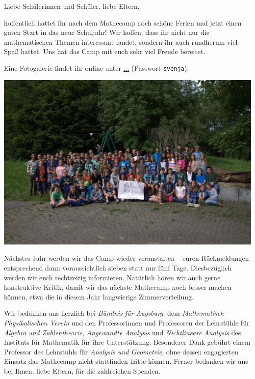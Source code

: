 \documentclass[12pt]{zettel}
\begin{document}
\renewcommand{\betreff}{Mathecamp -- schön war's!}

\makeletterhead{}
\vspace{-2em}

Liebe Schülerinnen und Schüler, liebe Eltern,

hoffentlich hattet ihr nach dem Mathecamp noch schöne Ferien und jetzt einen
guten Start in das neue Schuljahr! Wir hoffen, dass ihr nicht nur die
mathematischen Themen interessant fandet, sondern ihr auch rundherum viel
Spaß hattet. Uns hat das Camp mit euch sehr viel Freude bereitet.

Eine Fotogalerie findet ihr online unter \url{...} (Passwort \texttt{svenja}).

\begin{center}
  \includegraphics[scale=0.25]{gruppenfoto}
\end{center}

Nächstes Jahr werden wir das Camp wieder veranstalten -- euren Rückmeldungen
entsprechend dann voraussichtlich sieben statt nur fünf Tage. Diesbezüglich
werden wir euch rechtzeitig informieren. Natürlich hören wir auch gerne
konstruktive Kritik, damit wir das nächste Mathecamp noch besser
machen können, etwa die in diesem Jahr langwierige Zimmerverteilung.

Wir bedanken uns herzlich bei \emph{Bündnis für Augsburg}, dem
\emph{Mathematisch-Physikalischen Verein} und den Professorinnen und
Professoren der Lehrstühle für \emph{Algebra und Zahlentheorie},
\emph{Angewandte Analysis} und \emph{Nichtlineare Analysis} des Instituts für
Mathematik für ihre Unterstützung.
Besonderer Dank gebührt einem Professor des
Lehrstuhls für \emph{Analysis und Geometrie}, ohne dessen engagierten Einsatz
das Mathecamp nicht stattfinden hätte können.
Ferner bedanken wir uns bei Ihnen, liebe Eltern, für die zahlreichen
Spenden.
\end{document}
